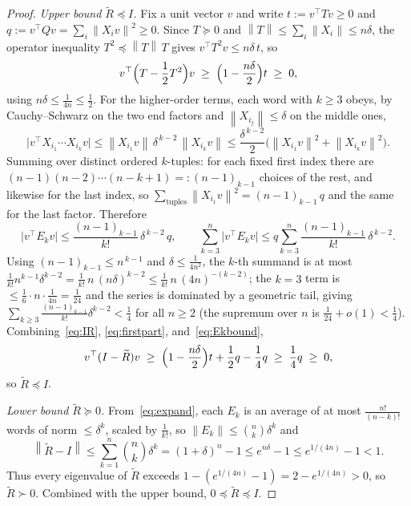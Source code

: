 \documentclass[10pt,a4paper]{amsart}
\newcommand{\norm}[1]{\left\lVert #1 \right\rVert}
\newcommand{\psdge}{\succeq}
\newcommand{\psdle}{\preceq}
\begin{document}
\begin{proof}
\emph{Upper bound $\widetilde R\psdle I$.} Fix a unit vector $v$ and write $t:=v^\top Tv\ge0$ and
$q:=v^\top Qv=\sum_i\norm{X_iv}^2\ge0$. Since $T\psdge0$ and $\norm{T}\le\sum_i\norm{X_i}\le n\delta$,
the operator inequality $T^2\psdle\norm{T}\,T$ gives $v^\top T^2v\le n\delta\,t$, so
\begin{equation}\label{eq:firstpart}
v^\top\Bigl(T-\frac12T^2\Bigr)v\;\ge\;\Bigl(1-\frac{n\delta}2\Bigr)t\;\ge\;0,
\end{equation}
using $n\delta\le\frac1{4n}\le\frac12$. For the higher-order terms, each word with $k\ge3$ obeys,
by Cauchy--Schwarz on the two end factors and $\norm{X_{i_j}}\le\delta$ on the middle ones,
\[
\bigl|v^\top X_{i_1}\cdots X_{i_k}v\bigr|
\le\norm{X_{i_1}v}\,\delta^{\,k-2}\,\norm{X_{i_k}v}
\le\frac{\delta^{\,k-2}}2\bigl(\norm{X_{i_1}v}^2+\norm{X_{i_k}v}^2\bigr).
\]
Summing over distinct ordered $k$-tuples: for each fixed first index there are
$(n-1)(n-2)\cdots(n-k+1)=:(n-1)_{k-1}$ choices of the rest, and likewise for the last index, so
$\sum_{\text{tuples}}\norm{X_{i_1}v}^2=(n-1)_{k-1}\,q$ and the same for the last factor. Therefore
\begin{equation}\label{eq:Ekbound}
\bigl|v^\top E_kv\bigr|\le\frac{(n-1)_{k-1}}{k!}\,\delta^{\,k-2}\,q,
\qquad
\sum_{k=3}^n\bigl|v^\top E_kv\bigr|\le q\sum_{k=3}^n\frac{(n-1)_{k-1}}{k!}\,\delta^{\,k-2}.
\end{equation}
Using $(n-1)_{k-1}\le n^{\,k-1}$ and $\delta\le\frac1{4n^2}$, the $k$-th summand is at most
$\frac1{k!}n^{k-1}\delta^{k-2}=\frac1{k!}\,n\,(n\delta)^{k-2}\le\frac1{k!}\,n\,(4n)^{-(k-2)}$; the
$k=3$ term is $\le\frac16\cdot n\cdot\frac1{4n}=\frac1{24}$ and the series is dominated by a
geometric tail, giving $\sum_{k\ge3}\frac{(n-1)_{k-1}}{k!}\delta^{k-2}<\frac14$ for all $n\ge2$
(the supremum over $n$ is $\frac1{24}+o(1)<\frac14$). Combining~\eqref{eq:IR},
\eqref{eq:firstpart}, and~\eqref{eq:Ekbound},
\[
v^\top(I-\widetilde R)v\;\ge\;\Bigl(1-\frac{n\delta}2\Bigr)t+\frac12q-\frac14q\;\ge\;\frac14q\;\ge\;0,
\]
so $\widetilde R\psdle I$.

\emph{Lower bound $\widetilde R\psdge0$.} From~\eqref{eq:expand}, each $E_k$ is an average of at most
$\frac{n!}{(n-k)!}$ words of norm $\le\delta^k$, scaled by $\frac1{k!}$, so
$\norm{E_k}\le\binom nk\delta^k$ and
\[
\norm{\widetilde R-I}\le\sum_{k=1}^n\binom nk\delta^k=(1+\delta)^n-1\le e^{n\delta}-1\le
e^{1/(4n)}-1<1.
\]
Thus every eigenvalue of $\widetilde R$ exceeds $1-(e^{1/(4n)}-1)=2-e^{1/(4n)}>0$, so
$\widetilde R\succ0$. Combined with the upper bound, $0\psdle\widetilde R\psdle I$.
\end{proof}
\end{document}
